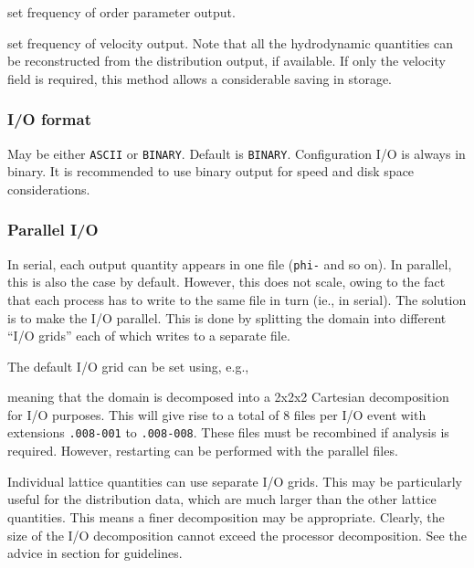 
set frequency of order parameter output.


set frequency of velocity output. Note that all the hydrodynamic
quantities can be reconstructed from the distribution output, if
available. If only the velocity field is required, this method
allows a considerable saving in storage.


\subsubsection{I/O format}




May be either \texttt{ASCII} or \texttt{BINARY}. Default is \texttt{BINARY}.
Configuration I/O is always in binary. It is recommended to use
binary output for speed and disk space considerations.

\subsubsection{Parallel I/O}

In serial, each output quantity appears in one file (\texttt{phi-}
and so on). In parallel, this is also the case by default. However,
this does not scale, owing to the fact that each process has to
write to the same file in turn (ie., in serial). The solution is
to make the I/O parallel. This is done by splitting the domain into
different ``I/O grids'' each of which writes to a separate file.

The default I/O grid can be set using, e.g.,


meaning that the domain is decomposed into a 2x2x2 Cartesian
decomposition for I/O purposes. This will give rise to a total
of 8 files per I/O event with extensions \texttt{.008-001} to
\texttt{.008-008}. These files must be recombined if analysis
is required. However, restarting can be performed with the
parallel files.

Individual lattice quantities can use separate I/O grids. This
may be particularly useful for the distribution data, which are
much larger than the other lattice quantities. This means a
finer decomposition may be appropriate. Clearly, the size of the
I/O decomposition cannot exceed the processor decomposition.
See the advice in section \cite{section-advice} for guidelines.



